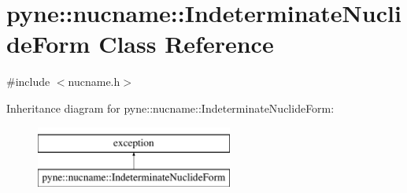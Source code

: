 \hypertarget{classpyne_1_1nucname_1_1_indeterminate_nuclide_form}{}\section{pyne\+:\+:nucname\+:\+:Indeterminate\+Nuclide\+Form Class Reference}
\label{classpyne_1_1nucname_1_1_indeterminate_nuclide_form}


{\ttfamily \#include $<$nucname.\+h$>$}

Inheritance diagram for pyne\+:\+:nucname\+:\+:Indeterminate\+Nuclide\+Form\+:\begin{figure}[H]
\begin{center}
\leavevmode
\includegraphics[height=2.000000cm]{classpyne_1_1nucname_1_1_indeterminate_nuclide_form}
\end{center}
\end{figure}
